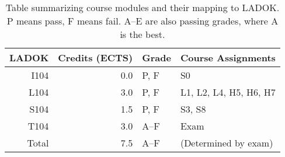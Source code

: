\begin{table}
  \centering
  \setlength{\tabcolsep}{0.5em}
  \begin{tabular}{rrll}
    \toprule
    \textbf{LADOK}
    & \textbf{Credits (ECTS)}
    & \textbf{Grade}
    & \textbf{Course Assignments}
    \\
    \midrule
    I104  & 0.0             & P, F        & S0\\
    L104  & 3.0             & P, F        & L1, L2, L4, H5, H6, H7\\
    S104  & 1.5             & P, F        & S3, S8\\
    T104  & 3.0             & A--F        & Exam\\
    \midrule
    Total & 7.5             & A--F        & (Determined by exam)\\
    \bottomrule
  \end{tabular}
  \caption{%
    Table summarizing course modules and their mapping to LADOK\@.
    P means pass, F means fail.
    A--E are also passing grades, where A is the best.
  }\label{LADOKTable}
\end{table}
